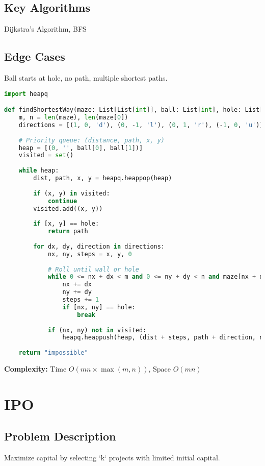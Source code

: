 \documentclass[10pt, a4paper]{article}
\begin{document}
\subsection*{Key Algorithms}
Dijkstra's Algorithm, BFS

\subsection*{Edge Cases}
Ball starts at hole, no path, multiple shortest paths.

\begin{lstlisting}[language=Python]
import heapq

def findShortestWay(maze: List[List[int]], ball: List[int], hole: List[int]) -> str:
    m, n = len(maze), len(maze[0])
    directions = [(1, 0, 'd'), (0, -1, 'l'), (0, 1, 'r'), (-1, 0, 'u')]
    
    # Priority queue: (distance, path, x, y)
    heap = [(0, '', ball[0], ball[1])]
    visited = set()
    
    while heap:
        dist, path, x, y = heapq.heappop(heap)
        
        if (x, y) in visited:
            continue
        visited.add((x, y))
        
        if [x, y] == hole:
            return path
        
        for dx, dy, direction in directions:
            nx, ny, steps = x, y, 0
            
            # Roll until wall or hole
            while 0 <= nx + dx < m and 0 <= ny + dy < n and maze[nx + dx][ny + dy] == 0:
                nx += dx
                ny += dy
                steps += 1
                if [nx, ny] == hole:
                    break
            
            if (nx, ny) not in visited:
                heapq.heappush(heap, (dist + steps, path + direction, nx, ny))
    
    return "impossible"
\end{lstlisting}
\textbf{Complexity:} Time $O(mn \times \max(m,n))$, Space $O(mn)$

\section{IPO}
\subsection*{Problem Description}
Maximize capital by selecting `k` projects with limited initial capital.
\end{document}
